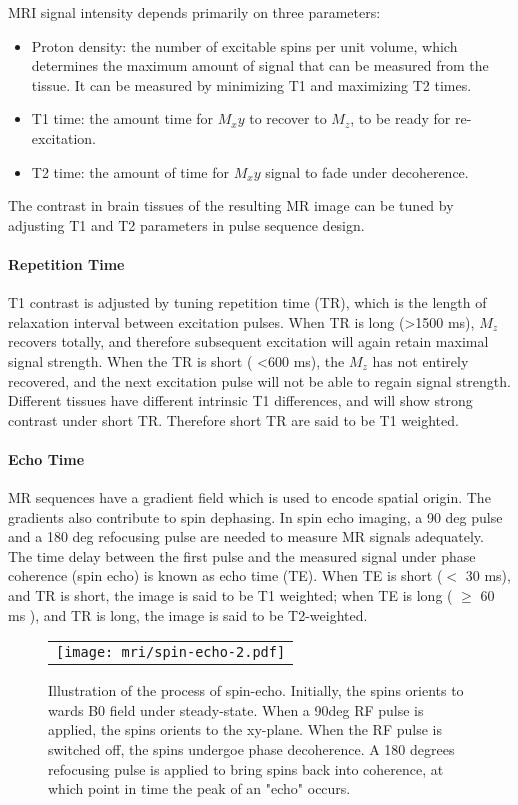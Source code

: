 MRI signal intensity depends primarily on three parameters: 
\begin{itemize}
\item Proton density: the number of excitable spins per unit volume, which determines the maximum amount of signal that can be measured from the tissue. It can be measured by minimizing T1 and maximizing T2 times. 
\item T1 time: the amount time for $M_xy$ to recover to $M_z$, to be ready for re-excitation.
\item T2 time: the amount of time for $M_xy$ signal to fade under decoherence. 
\end{itemize}
The contrast in brain tissues of the resulting MR image can be tuned by adjusting T1  and T2 parameters in pulse sequence design.

\paragraph{Repetition Time}
T1 contrast is adjusted by tuning repetition time (TR), which is the length of relaxation interval between excitation pulses. When TR is long (\textgreater 1500 ms), $M_z$ recovers totally, and therefore subsequent excitation will again retain maximal signal strength. When the TR is short (
\textless 600 ms), the $M_z$ has not entirely recovered, and the next excitation pulse will not be able to regain signal strength. Different tissues have different intrinsic T1 differences, and will show strong contrast under short TR. Therefore short TR are said to be T1 weighted. 

\paragraph{Echo Time}
MR sequences have a gradient field which is used to encode spatial origin. The gradients also contribute to spin dephasing. In spin echo imaging, a 90 deg pulse and a 180 deg refocusing pulse are needed to measure MR signals adequately. The time delay between the first pulse and the measured signal under phase coherence (spin echo) is known as echo time (TE). When TE is short ($<$ 30 ms), and TR is short, the image is said to be T1 weighted; when TE is long ( $\geq$ 60 ms ), and TR is long, the image is said to be T2-weighted. 

\begin{figure}[htb]
\begin{center}
\begin{tabular}{c}
\texttt{[image: mri/spin-echo-2.pdf]}
\end{tabular}
\caption{Illustration of the process of spin-echo. Initially, the spins orients to wards B0 field under steady-state. When a 90deg RF pulse is applied, the spins orients to the xy-plane. When the RF pulse is switched off, the spins undergoe phase decoherence. A 180 degrees refocusing pulse is applied to bring spins back into coherence, at which point in time the peak of an "echo" occurs.  } \label{fig:spin-echo}
\end{center}
\end{figure}

